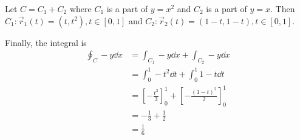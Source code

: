 \documentclass[12pt,final]{novelette} %
\begin{document}
Let $C = C_1 + C_2$ where $C_1$ is a part of $y = x^2$ and $C_2$ is a part of $y = x$.
Then $C_1: \vec{r}_1(t) = (t, t^2), t \in [0, 1]$ and $C_2: \vec{r}_2(t) = (1-t, 1-t), t \in [0, 1]$.

\medskip
Finally, the integral is
\begin{align*}
    \oint_C -y \dd{x} & = \int_{C_1} -y \dd{x} + \int_{C_2} -y \dd{x}                           \\
                      & = \int_0^1 -t^2 \dd{t} + \int_0^1 1-t \dd{t}                            \\
                      & = \left[-\frac{t^3}{3}\right]_0^1 + \left[-\frac{(1-t)^2}{2}\right]_0^1 \\
                      & = -\frac13 + \frac12                                                    \\
                      & = \boxed{\frac16}
\end{align*}
\end{document}
